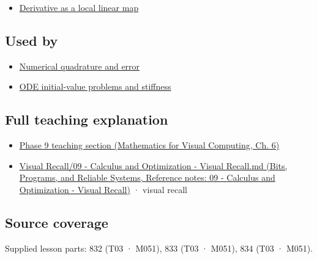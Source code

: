 \begin{itemize}
\tightlist
\item
  \hyperref[appendix-7bc181935c42]{Derivative as a local linear map}
\end{itemize}

\subsection{Used by}\label{appendix-1a50e72435c2-used-by}

\hypertarget{appendix-1a50e72435c2-used-by}{}

\begin{itemize}
\tightlist
\item
  \hyperref[appendix-80521eae6b71]{Numerical quadrature and error}
\item
  \hyperref[appendix-e8ab9836882e]{ODE initial-value problems and stiffness}
\end{itemize}

\subsection{Full teaching explanation}\label{appendix-1a50e72435c2-full-teaching-explanation}

\hypertarget{appendix-1a50e72435c2-full-teaching-explanation}{}

\begin{itemize}
\tightlist
\item
  \href{../02-Mathematics-for-Visual-Computing/main.pdf\#nameddest=02-foundations-ii-ch022-integration-and-quadrature}{Phase 9 teaching section (Mathematics for Visual Computing, Ch. 6)}
\item
  \href{../01-Bits-Programs-and-Reliable-Systems/main.pdf\#nameddest=appendix-adf48f5dc5c1}{Visual Recall/09 - Calculus and Optimization - Visual Recall.md (Bits, Programs, and Reliable Systems, Reference notes: 09 - Calculus and Optimization - Visual Recall)} · visual recall
\end{itemize}

\subsection{Source coverage}\label{appendix-1a50e72435c2-source-coverage}

\hypertarget{appendix-1a50e72435c2-source-coverage}{}

Supplied lesson parts: 832 (T03 · M051), 833 (T03 · M051), 834 (T03 · M051).

